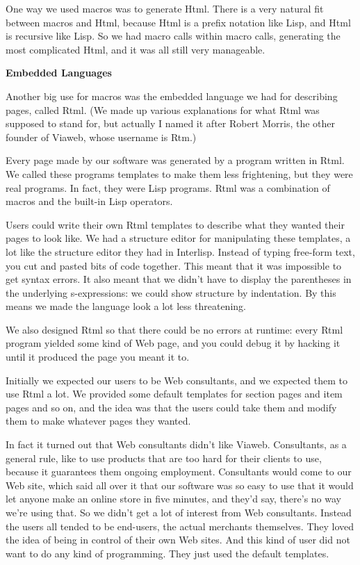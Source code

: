 One way we used macros was to generate Html. There is a very natural fit
between macros and Html, because Html is a prefix notation like Lisp,
and Html is recursive like Lisp. So we had macro calls within macro
calls, generating the most complicated Html, and it was all still very
manageable.

\textbf{Embedded Languages}

Another big use for macros was the embedded language we had for
describing pages, called Rtml. (We made up various explanations for what
Rtml was supposed to stand for, but actually I named it after Robert
Morris, the other founder of Viaweb, whose username is Rtm.)

Every page made by our software was generated by a program written in
Rtml. We called these programs templates to make them less frightening,
but they were real programs. In fact, they were Lisp programs. Rtml was
a combination of macros and the built-in Lisp operators.

Users could write their own Rtml templates to describe what they wanted
their pages to look like. We had a structure editor for manipulating
these templates, a lot like the structure editor they had in Interlisp.
Instead of typing free-form text, you cut and pasted bits of code
together. This meant that it was impossible to get syntax errors. It
also meant that we didn't have to display the parentheses in the
underlying s-expressions: we could show structure by indentation. By
this means we made the language look a lot less threatening.

We also designed Rtml so that there could be no errors at runtime: every
Rtml program yielded some kind of Web page, and you could debug it by
hacking it until it produced the page you meant it to.

Initially we expected our users to be Web consultants, and we expected
them to use Rtml a lot. We provided some default templates for section
pages and item pages and so on, and the idea was that the users could
take them and modify them to make whatever pages they wanted.

In fact it turned out that Web consultants didn't like Viaweb.
Consultants, as a general rule, like to use products that are too hard
for their clients to use, because it guarantees them ongoing employment.
Consultants would come to our Web site, which said all over it that our
software was so easy to use that it would let anyone make an online
store in five minutes, and they'd say, there's no way we're using that.
So we didn't get a lot of interest from Web consultants. Instead the
users all tended to be end-users, the actual merchants themselves. They
loved the idea of being in control of their own Web sites. And this kind
of user did not want to do any kind of programming. They just used the
default templates.

